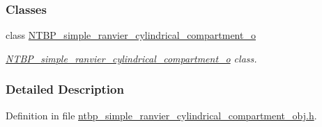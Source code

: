\subsubsection*{Classes}
\begin{DoxyCompactItemize}
\item 
class \hyperlink{class_n_t_b_p__simple__ranvier__cylindrical__compartment__o}{NTBP\_\-simple\_\-ranvier\_\-cylindrical\_\-compartment\_\-o}
\begin{DoxyCompactList}\small\item\em \hyperlink{class_n_t_b_p__simple__ranvier__cylindrical__compartment__o}{NTBP\_\-simple\_\-ranvier\_\-cylindrical\_\-compartment\_\-o} class. \item\end{DoxyCompactList}\end{DoxyCompactItemize}


\subsubsection{Detailed Description}


Definition in file \hyperlink{ntbp__simple__ranvier__cylindrical__compartment__obj_8h_source}{ntbp\_\-simple\_\-ranvier\_\-cylindrical\_\-compartment\_\-obj.h}.

